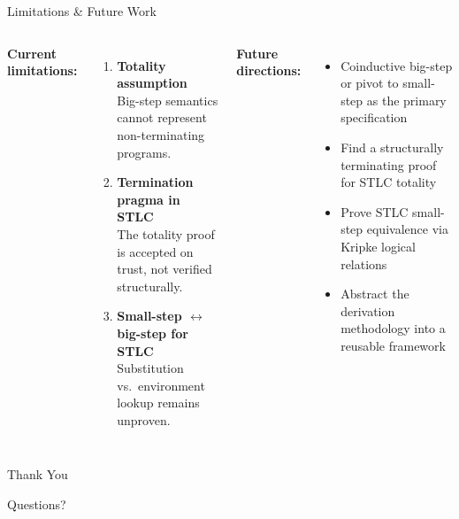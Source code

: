 \documentclass[10pt,compress,aspectratio=169]{beamer}
\begin{document}
\begin{frame}{Limitations \& Future Work}
  \begin{columns}[T]
      \textbf{Current limitations:}
      \begin{enumerate}\setlength{\itemsep}{6pt}
        \item \textbf{Totality assumption}\\[2pt]
              Big-step semantics cannot represent non-terminating programs.
        \item \textbf{Termination pragma in STLC}\\[2pt]
              The totality proof is accepted on trust, not verified structurally.
        \item \textbf{Small-step $\leftrightarrow$ big-step for STLC}\\[2pt]
              Substitution vs.\ environment lookup remains unproven.
      \end{enumerate}
      \textbf{Future directions:}
      \begin{itemize}\setlength{\itemsep}{6pt}
        \item Coinductive big-step or pivot to small-step as the primary specification
        \item Find a structurally terminating proof for STLC totality
        \item Prove STLC small-step equivalence via Kripke logical relations
        \item Abstract the derivation methodology into a reusable framework
      \end{itemize}
  \end{columns}
\end{frame}

\begin{frame}{}
  \centering\vfill
  {\Large Thank You\par}
  \bigskip
  Questions?
  \vfill
\end{frame}
\end{document}
